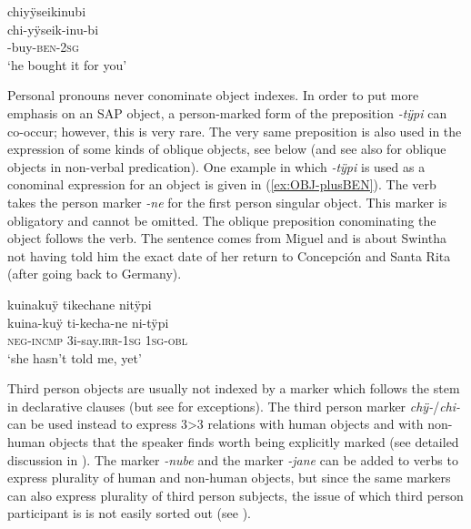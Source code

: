 \ea\label{ex:buy-for-you}
\begingl
\glpreamble chiyÿseikinubi\\
\gla chi-yÿseik-inu-bi\\
-buy-\textsc{ben}-2\textsc{sg}\\
\glft ‘he bought it for you’
\endgl
\trailingcitation{[cxx-e120410ls-2.006]}
\xe
{}

Personal pronouns never conominate object indexes. In order to put more emphasis on an SAP object, a person-marked form of the preposition \textit{-tÿpi} can co-occur; however, this is very rare. The very same preposition is also used in the expression of some kinds of oblique objects, see  below (and see also  for oblique objects in non-verbal predication).
One example in which \textit{-tÿpi} is used as a conominal expression for an object is given in (\ref{ex:OBJ-plusBEN}). The verb takes the person marker \textit{-ne} for the first person singular object. This marker is obligatory and cannot be omitted. The oblique preposition conominating the object follows the verb. The sentence comes from Miguel and is about Swintha not having told him the exact date of her return to Concepción and Santa Rita (after going back to Germany).

\ea\label{ex:OBJ-plusBEN}
\begingl 
\glpreamble kuinakuÿ tikechane nitÿpi\\
\gla kuina-kuÿ ti-kecha-ne ni-tÿpi\\ 
\glb \textsc{neg}-\textsc{incmp} 3i-say.\textsc{irr}-1\textsc{sg} 1\textsc{sg}-\textsc{obl}\\ 
\glft ‘she hasn’t told me, yet’
\trailingcitation{[mxx-d110813s-2.052]}
\xe


Third person objects are usually not indexed by a marker which follows the stem in declarative clauses (but see  for exceptions). The third person marker \textit{chÿ-}/\textit{chi-} can be used instead to express 3>3 relations with human objects and with non-human objects that the speaker finds worth being explicitly marked (see detailed discussion in ). The  marker \textit{-nube} and the  marker \textit{-jane} can be added to verbs to express plurality of human and non-human objects, but since the same markers can also express plurality of third person subjects, the issue of which third person participant is  is not easily sorted out (see ).

